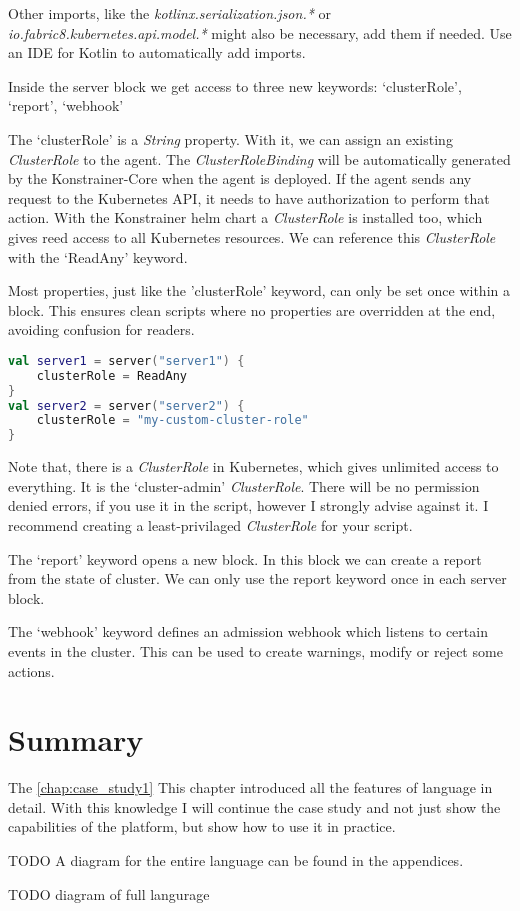 Other imports, like the \emph{kotlinx.serialization.json.*} or \emph{io.fabric8.kubernetes.api.model.*} might also be necessary, add them if needed. Use an IDE for Kotlin to automatically add imports.

Inside the server block we get access to three new keywords: `clusterRole', `report', `webhook'

The `clusterRole' is a \emph{String} property. With it, we can assign an existing \emph{ClusterRole} to the agent. The \emph{ClusterRoleBinding} will be automatically generated by the Konstrainer-Core when the agent is deployed. If the agent sends any request to the Kubernetes API, it needs to have authorization to perform that action. With the Konstrainer helm chart a \emph{ClusterRole} is installed too, which gives reed access to all Kubernetes resources. We can reference this \emph{ClusterRole} with the `ReadAny' keyword.

Most properties, just like the 'clusterRole' keyword, can only be set once within a block. This ensures clean scripts where no properties are overridden at the end, avoiding confusion for readers.

\begin{lstlisting}[caption={Usage of the clusterRole keyword},language=Kotlin,label=code:clusterrole_usage]
val server1 = server("server1") {
    clusterRole = ReadAny
}
val server2 = server("server2") {
    clusterRole = "my-custom-cluster-role"
}
\end{lstlisting}

Note that, there is a \emph{ClusterRole} in Kubernetes, which gives unlimited access to everything. It is the `cluster-admin' \emph{ClusterRole}. There will be no permission denied errors, if you use it in the script, however I strongly advise against it. I recommend creating a least-privilaged \emph{ClusterRole} for your script.

The `report' keyword opens a new block. In this block we can create a report from the state of cluster. We can only use the report keyword once in each server block.

The `webhook' keyword defines an admission webhook which listens to certain events in the cluster. This can be used to create warnings, modify or reject some actions.





\section{Summary}

The \ref{chap:case_study1}
This chapter introduced all the features of language in detail. With this knowledge I will continue the case study and not just show the capabilities of the platform, but show how to use it in practice.

TODO A diagram for the entire language can be found in the appendices.

TODO diagram of full langurage


